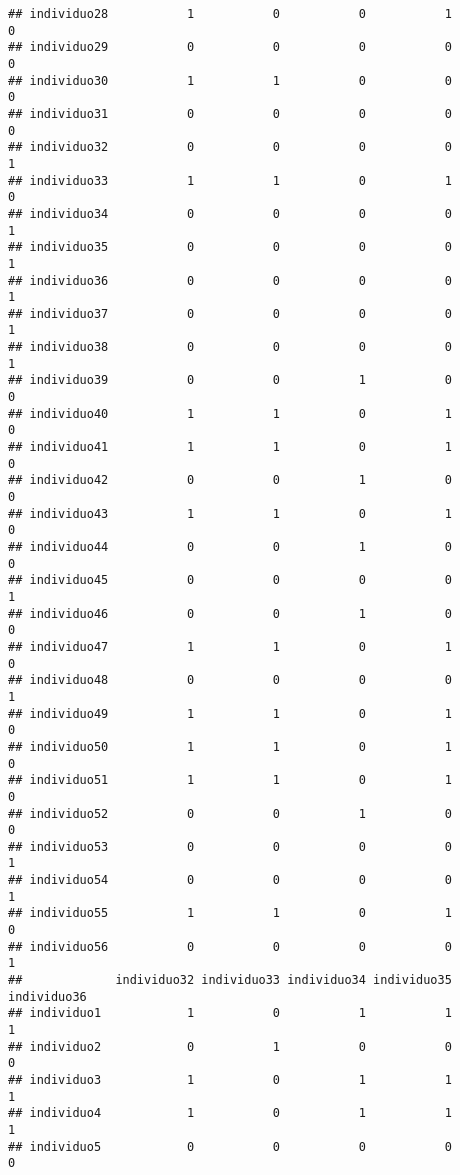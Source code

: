 \documentclass[
]{article}
\begin{document}
\begin{verbatim}
## individuo28           1           0           0           1           0
## individuo29           0           0           0           0           0
## individuo30           1           1           0           0           0
## individuo31           0           0           0           0           0
## individuo32           0           0           0           0           1
## individuo33           1           1           0           1           0
## individuo34           0           0           0           0           1
## individuo35           0           0           0           0           1
## individuo36           0           0           0           0           1
## individuo37           0           0           0           0           1
## individuo38           0           0           0           0           1
## individuo39           0           0           1           0           0
## individuo40           1           1           0           1           0
## individuo41           1           1           0           1           0
## individuo42           0           0           1           0           0
## individuo43           1           1           0           1           0
## individuo44           0           0           1           0           0
## individuo45           0           0           0           0           1
## individuo46           0           0           1           0           0
## individuo47           1           1           0           1           0
## individuo48           0           0           0           0           1
## individuo49           1           1           0           1           0
## individuo50           1           1           0           1           0
## individuo51           1           1           0           1           0
## individuo52           0           0           1           0           0
## individuo53           0           0           0           0           1
## individuo54           0           0           0           0           1
## individuo55           1           1           0           1           0
## individuo56           0           0           0           0           1
##             individuo32 individuo33 individuo34 individuo35 individuo36
## individuo1            1           0           1           1           1
## individuo2            0           1           0           0           0
## individuo3            1           0           1           1           1
## individuo4            1           0           1           1           1
## individuo5            0           0           0           0           0

\end{verbatim}
\end{document}
